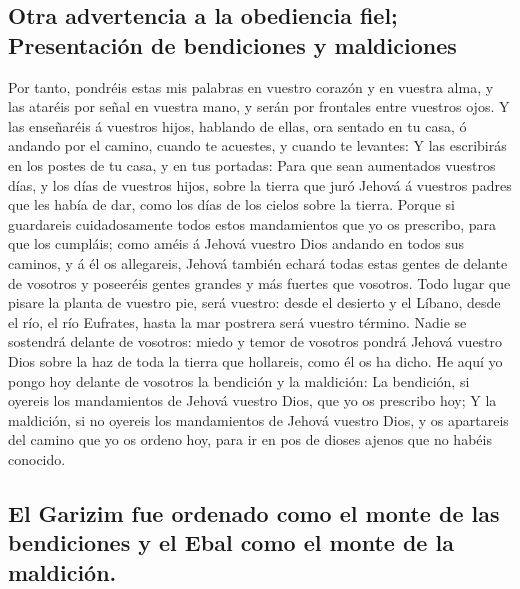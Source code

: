 \hypertarget{otra-advertencia-a-la-obediencia-fiel-presentaciuxf3n-de-bendiciones-y-maldiciones}{%
\subsection{Otra advertencia a la obediencia fiel; Presentación de
bendiciones y
maldiciones}\label{otra-advertencia-a-la-obediencia-fiel-presentaciuxf3n-de-bendiciones-y-maldiciones}}

 Por tanto, pondréis estas mis palabras en vuestro corazón
y en vuestra alma, y las ataréis por señal en vuestra mano, y serán por
frontales entre vuestros ojos.  Y las enseñaréis á vuestros
hijos, hablando de ellas, ora sentado en tu casa, ó andando por el
camino, cuando te acuestes, y cuando te levantes:  Y las
escribirás en los postes de tu casa, y en tus portadas: 
Para que sean aumentados vuestros días, y los días de vuestros hijos,
sobre la tierra que juró Jehová á vuestros padres que les había de dar,
como los días de los cielos sobre la tierra.  Porque si
guardareis cuidadosamente todos estos mandamientos que yo os prescribo,
para que los cumpláis; como améis á Jehová vuestro Dios andando en todos
sus caminos, y á él os allegareis,  Jehová también echará
todas estas gentes de delante de vosotros y poseeréis gentes grandes y
más fuertes que vosotros.  Todo lugar que pisare la planta
de vuestro pie, será vuestro: desde el desierto y el Líbano, desde el
río, el río Eufrates, hasta la mar postrera será vuestro término.
 Nadie se sostendrá delante de vosotros: miedo y temor de
vosotros pondrá Jehová vuestro Dios sobre la haz de toda la tierra que
hollareis, como él os ha dicho.  He aquí yo pongo hoy
delante de vosotros la bendición y la maldición:  La
bendición, si oyereis los mandamientos de Jehová vuestro Dios, que yo os
prescribo hoy;  Y la maldición, si no oyereis los
mandamientos de Jehová vuestro Dios, y os apartareis del camino que yo
os ordeno hoy, para ir en pos de dioses ajenos que no habéis conocido.

\hypertarget{el-garizim-fue-ordenado-como-el-monte-de-las-bendiciones-y-el-ebal-como-el-monte-de-la-maldiciuxf3n.}{%
\subsection{El Garizim fue ordenado como el monte de las bendiciones y
el Ebal como el monte de la
maldición.}\label{el-garizim-fue-ordenado-como-el-monte-de-las-bendiciones-y-el-ebal-como-el-monte-de-la-maldiciuxf3n.}}


